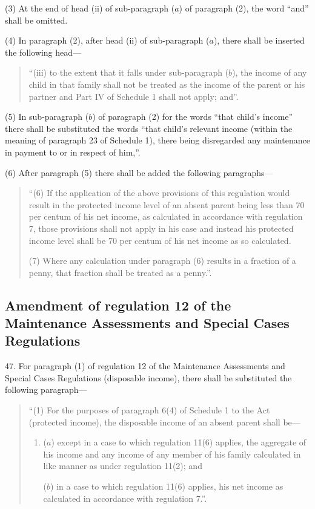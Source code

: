\documentclass[a4paper]{article}
\begin{document}
(3) At the end of head (ii) of sub-paragraph ($a$) of paragraph (2), the word “and” shall be omitted.

(4) In paragraph (2), after head (ii) of sub-paragraph ($a$), there shall be inserted the following head—
\begin{quotation}
“(iii) to the extent that it falls under sub-paragraph ($b$), the income of any child in that family shall not be treated as the income of the parent or his partner and Part IV of Schedule 1 shall not apply; and”.
\end{quotation}

(5) In sub-paragraph ($b$) of paragraph (2) for the words “that child’s income” there shall be substituted the words “that child’s relevant income (within the meaning of paragraph 23 of Schedule 1), there being disregarded any maintenance in payment to or in respect of him,”.

(6) After paragraph (5) there shall be added the following paragraphs—
\begin{quotation}
“(6) If the application of the above provisions of this regulation would result in the protected income level of an absent parent being less than 70 per centum of his net income, as calculated in accordance with regulation 7, those provisions shall not apply in his case and instead his protected income level shall be 70 per centum of his net income as so calculated.

(7) Where any calculation under paragraph (6) results in a fraction of a penny, that fraction shall be treated as a penny.”.
\end{quotation}

\subsection[47. Amendment of regulation 12 of the Maintenance Assessments and Special Cases Regulations]{Amendment of regulation 12 of the Maintenance Assessments and Special Cases Regulations}

47.  For paragraph (1) of regulation 12 of the Maintenance Assessments and Special Cases Regulations (disposable income), there shall be substituted the following paragraph—
\begin{quotation}
“(1) For the purposes of paragraph 6(4) of Schedule 1 to the Act (protected income), the disposable income of an absent parent shall be—
\begin{enumerate}\item[]
($a$) except in a case to which regulation 11(6) applies, the aggregate of his income and any income of any member of his family calculated in like manner as under regulation 11(2); and

($b$) in a case to which regulation 11(6) applies, his net income as calculated in accordance with regulation 7.”.
\end{enumerate}
\end{quotation}
\end{document}
